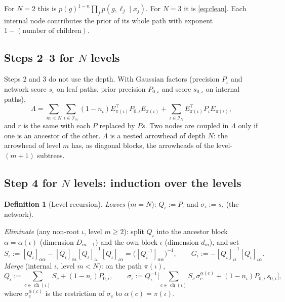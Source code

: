 \documentclass[11pt]{article}
\theoremstyle{definition}
\newtheorem{definition}{Definition}
\theoremstyle{remark}
\newcommand{\T}{\top}
\newcommand{\ch}{\operatorname{ch}}
\begin{document}
For $N=2$ this is $p(g)^{1-n}\prod_jp(g,\ell_j\mid x_j)$. For $N=3$ it is
\eqref{eq:clean}. Each internal node contributes the prior of its whole path with
exponent $1-(\text{number of children})$.

\subsection{Steps 2--3 for $N$ levels}

Steps 2 and 3 do not use the depth. With Gaussian factors (precision $P_\iota$ and
network score $s_\iota$ on leaf paths, prior precision $P_{0,\iota}$ and score
$s_{0,\iota}$ on internal paths),
\begin{equation}\label{eq:nsystem}
\Lambda=\sum_{m<N}\sum_{\iota\in\mathcal{I}_m}(1-n_\iota)E_{\pi(\iota)}^\T P_{0,\iota}E_{\pi(\iota)}+\sum_{\iota\in\mathcal{I}_N}E_{\pi(\iota)}^\T P_\iota E_{\pi(\iota)},
\end{equation}
and $r$ is the same with each $P$ replaced by $Ps$. Two nodes are coupled in
$\Lambda$ only if one is an ancestor of the other. $\Lambda$ is a nested arrowhead
of depth $N$: the arrowhead of level $m$ has, as diagonal blocks, the arrowheads of
the level-$(m+1)$ subtrees.

\subsection{Step 4 for $N$ levels: induction over the levels}

\begin{definition}[Level recursion]\label{def:recursion}
\emph{Leaves} ($m=N$): $Q_\iota:=P_\iota$ and $\sigma_\iota:=s_\iota$ (the network).

\emph{Eliminate} (any non-root $\iota$, level $m\ge2$): split $Q_\iota$ into the
ancestor block $\alpha=\alpha(\iota)$ (dimension $D_{m-1}$) and the own block
$\iota$ (dimension $d_m$), and set
\begin{equation}\label{eq:n-elim}
S_\iota:=[Q_\iota]_{\alpha\alpha}-[Q_\iota]_{\alpha\iota}[Q_\iota]_{\iota\iota}^{-1}[Q_\iota]_{\iota\alpha}=\big([Q_\iota^{-1}]_{\alpha\alpha}\big)^{-1},\qquad
G_\iota:=-[Q_\iota]_{\iota\iota}^{-1}[Q_\iota]_{\iota\alpha}.
\end{equation}
\emph{Merge} (internal $\iota$, level $m<N$): on the path $\pi(\iota)$,
\begin{equation}\label{eq:n-merge}
Q_\iota:=\sum_{c\in\ch(\iota)}S_c+(1-n_\iota)P_{0,\iota},\qquad
\sigma_\iota:=Q_\iota^{-1}\Big[\sum_{c\in\ch(\iota)}S_c\,\sigma_c^{\alpha(c)}+(1-n_\iota)P_{0,\iota}\,s_{0,\iota}\Big],
\end{equation}
where $\sigma_c^{\alpha(c)}$ is the restriction of $\sigma_c$ to $\alpha(c)=\pi(\iota)$.
\end{definition}
\end{document}
